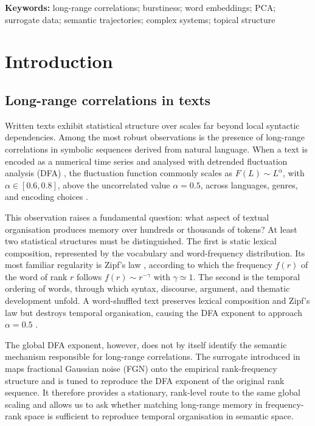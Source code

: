 \documentclass[12pt,a4paper]{article}
\begin{document}
\smallskip
\noindent\textbf{Keywords:} long-range correlations; burstiness; word
embeddings; PCA; surrogate data; semantic trajectories; complex systems;
topical structure

\section{Introduction}
\label{sec:intro}

\subsection{Long-range correlations in texts}

Written texts exhibit statistical structure over scales far beyond
local syntactic dependencies.
Among the most robust observations is the presence of long-range
correlations in symbolic sequences derived from natural language.
When a text is encoded as a numerical time series and analysed with
detrended fluctuation analysis (DFA) \citep{Peng1994}, the fluctuation
function commonly scales as $F(L)\sim L^\alpha$, with
$\alpha\in[0.6,0.8]$, above the uncorrelated value $\alpha=0.5$,
across languages, genres, and encoding choices
\citep{Ebeling1995,MontemurroPury2002}.

This observation raises a fundamental question: what aspect of textual
organisation produces memory over hundreds or thousands of tokens?
At least two statistical structures must be distinguished.
The first is static lexical composition, represented by the vocabulary
and word-frequency distribution.
Its most familiar regularity is Zipf's law \citep{Zipf1949}, according
to which the frequency $f(r)$ of the word of rank $r$ follows
$f(r)\sim r^{-\gamma}$ with $\gamma\simeq1$.
The second is the temporal ordering of words, through which syntax,
discourse, argument, and thematic development unfold.
A word-shuffled text preserves lexical composition and Zipf's law but
destroys temporal organisation, causing the DFA exponent to approach
$\alpha=0.5$ \citep{Ebeling1995,MontemurroPury2002}.

The global DFA exponent, however, does not by itself identify the
semantic mechanism responsible for long-range correlations.
The surrogate introduced in \citet{DegliEsposti2025} maps fractional
Gaussian noise (FGN) onto the empirical rank-frequency structure and is
tuned to reproduce the DFA exponent of the original rank sequence.
It therefore provides a stationary, rank-level route to the same global
scaling and allows us to ask whether matching long-range memory in
frequency-rank space is sufficient to reproduce temporal organisation in
semantic space.
\end{document}
